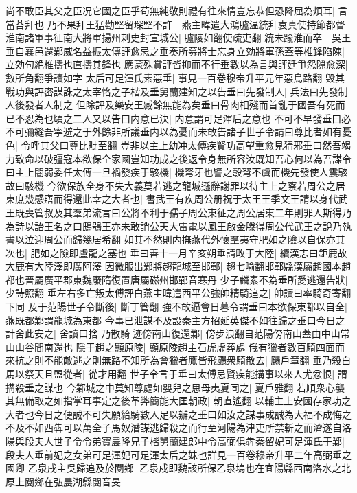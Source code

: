 尚不敢臣其父之臣况它國之臣乎苟無純敬則禮有往來情豈忘恭但恐降屈為煩耳|{
	言當荅拜也}
乃不果拜王猛勸堅留琛堅不許　燕主暐遣大鴻臚温統拜袁真使持節都督淮南諸軍事征南大將軍揚州刺史封宣城公|{
	臚陵如翻使疏吏翻}
統未踰淮而卒　吳王垂自襄邑還鄴威名益振太傅評愈忌之垂奏所募將士忘身立効將軍孫蓋等椎鋒陷陳|{
	立効句絶椎擣也直擣其鋒也}
應蒙殊賞評皆抑而不行垂數以為言與評廷爭怨隙愈深|{
	數所角翻爭讀如字}
太后可足渾氏素惡垂|{
	事見一百卷穆帝升平元年惡烏路翻}
毁其戰功與評密謀誅之太宰恪之子楷及垂舅蘭建知之以告垂曰先發制人|{
	兵法曰先發制人後發者人制之}
但除評及樂安王臧餘無能為矣垂曰骨肉相殘而首亂于國吾有死而已不忍為也頃之二人又以告曰内意已決|{
	内意謂可足渾后之意也}
不可不早發垂曰必不可彌縫吾寜避之于外餘非所議垂内以為憂而未敢告諸子世子令請曰尊比者如有憂色|{
	令呼其父曰尊比毗至翻}
豈非以主上幼冲太傅疾賢功高望重愈見猜邪垂曰然吾竭力致命以破彊寇本欲保全家國豈知功成之後返令身無所容汝既知吾心何以為吾謀令曰主上闇弱委任太傅一旦禍發疾于駭機|{
	機弩牙也譬之彀弩不虞而機先發使人震駭故曰駭機}
今欲保族全身不失大義莫若逃之龍城遜辭謝罪以待主上之察若周公之居東庶幾感寤而得還此幸之大者也|{
	書武王有疾周公册祝于太王王季文王請以身代武王既喪管叔及其羣弟流言曰公將不利于孺子周公東征之周公居東二年則罪人斯得乃為詩以詒王名之曰䲭鴞王亦未敢誚公天大雷電以風王啟金滕得周公代武王之說乃執書以泣迎周公而歸幾居希翻}
如其不然則内撫燕代外懷羣夷守肥如之險以自保亦其次也|{
	肥如之險即盧龍之塞也}
垂曰善十一月辛亥朔垂請畋于大陸|{
	續漢志曰鉅鹿故大鹿有大陸澤即廣阿澤}
因微服出鄴將趨龍城至邯鄲|{
	趨七喻翻邯鄲縣漢屬趙國本趙都也晉屬廣平郡東魏廢隋復置唐屬磁州邯鄲音寒丹}
少子麟素不為垂所愛逃還告狀|{
	少詩照翻}
垂左右多亡叛太傅評白燕主暐遣西平公強帥精騎追之|{
	帥讀曰率騎奇寄翻下同}
及于范陽世子令斷後|{
	斷丁管翻}
強不敢逼會日暮令謂垂曰本欲保東都以自全|{
	燕既都鄴謂龍城為東都}
今事已泄謀不及設秦主方招延英傑不如往歸之垂曰今日之計舍此安之|{
	舍讀曰捨}
乃散騎迹傍南山復還鄴|{
	傍步浪翻自范陽傍南山蓋由中山常山山谷間南還也}
隱于趙之顯原陵|{
	顯原陵趙主石虎虚葬處}
俄有獵者數百騎四面而來抗之則不能敵逃之則無路不知所為會獵者鷹皆飛颺衆騎散去|{
	颺戶章翻}
垂乃殺白馬以祭天且盟從者|{
	從才用翻}
世子令言于垂曰太傅忌賢疾能搆事以來人尤忿恨|{
	謂搆殺垂之謀也}
今鄴城之中莫知尊處如嬰兒之思母夷夏同之|{
	夏戶雅翻}
若順衆心襲其無備取之如指掌耳事定之後革弊簡能大匡朝政|{
	朝直遙翻}
以輔主上安國存家功之大者也今日之便誠不可失願給騎數人足以辦之垂曰如汝之謀事成誠為大福不成悔之不及不如西犇可以萬全子馬奴潛謀逃歸殺之而行至河陽為津吏所禁斬之而濟遂自洛陽與段夫人世子令令弟寶農隆兄子楷舅蘭建郎中令高弼俱犇秦留妃可足渾氏于鄴|{
	段夫人垂前妃之女弟可足渾妃可足渾太后之妹也詳見一百卷穆帝升平二年高弼垂之國卿}
乙泉戌主吳歸追及於閺鄉|{
	乙泉戍即魏該所保乙泉塢也在宜陽縣西南洛水之北原上閺鄉在弘農湖縣閺音旻}
